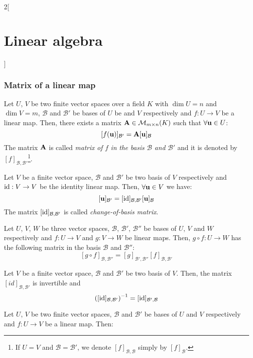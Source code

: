 \documentclass[../../../main.tex]{subfiles}
\begin{document}
\begin{multicols}{2}[\section{Linear algebra}]
  \subsubsection{Matrix of a linear map}
  \begin{prop}
    Let $U$, $V$ be two finite vector spaces over a field $K$ with $\dim U=n$ and $\dim V=m$, $\mathcal{B}$ and $\mathcal{B}'$ be bases of $U$ be and $V$ respectively and $f:U\rightarrow V$ be a linear map. Then, there exists a matrix $\boldsymbol{\mathrm{A}}\in\mathcal{M}_{m\times n}(K)$ such that $\forall\boldsymbol{\mathrm{u}}\in U$: $$[f(\boldsymbol{\mathrm{u}})]_{\mathcal{B}'}=\boldsymbol{\mathrm{A}}[\boldsymbol{\mathrm{u}}]_\mathcal{B}$$
    The matrix $\boldsymbol{\mathrm{A}}$ is called \textit{matrix of $f$ in the basis $\mathcal{B}$ and $\mathcal{B}'$} and it is denoted by $[f]_{\mathcal{B},\mathcal{B}'}$\footnote{If $U=V$ and $\mathcal{B}=\mathcal{B}'$, we denote $[f]_{\mathcal{B},\mathcal{B}}$ simply by $[f]_{\mathcal{B}}$.}.
  \end{prop}
  \begin{corollary}
    Let $V$ be a finite vector space, $\mathcal{B}$ and $\mathcal{B}'$ be two basis of $V$ respectively and $\mathrm{id}:V\rightarrow V$ be the identity linear map. Then, $\forall\boldsymbol{\mathrm{u}}\in V$ we have: $$[\boldsymbol{\mathrm{u}}]_{\mathcal{B}'}=[\mathrm{id}]_{\mathcal{B},\mathcal{B}'}[\boldsymbol{\mathrm{u}}]_\mathcal{B}$$ The matrix $[\mathrm{id}]_{\mathcal{B},\mathcal{B}'}$ is called \textit{change-of-basis matrix}.
  \end{corollary}
  \begin{prop}
    Let $U$, $V$, $W$ be three vector spaces, $\mathcal{B}$, $\mathcal{B}'$, $\mathcal{B}''$ be bases of $U$, $V$ and $W$ respectively and $f:U\rightarrow V$ and $g:V\rightarrow W$ be linear maps. Then, $g\circ f:U\rightarrow W$ has the following matrix in the basis $\mathcal{B}$ and $\mathcal{B}''$: $$[g\circ f]_{\mathcal{B},\mathcal{B}''}=[g]_{\mathcal{B}',\mathcal{B}''}[f]_{\mathcal{B},\mathcal{B}'}$$
  \end{prop}
  \begin{corollary}
    Let $V$ be a finite vector space, $\mathcal{B}$ and $\mathcal{B}'$ be two basis of $V$. Then, the matrix $[id]_{\mathcal{B},\mathcal{B}'}$ is invertible and $${\left([\mathrm{id}]_{\mathcal{B},\mathcal{B}'}\right)}^{-1}=[\mathrm{id}]_{\mathcal{B}',\mathcal{B}}$$
  \end{corollary}
  \begin{corollary}
    Let $U$, $V$ be two finite vector spaces, $\mathcal{B}$ and $\mathcal{B}'$ be bases of $U$ and $V$ respectively and $f:U\rightarrow V$ be a linear map. Then:

\end{corollary}
\end{multicols}
\end{document}
